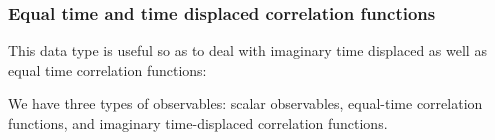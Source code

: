 \subsubsection{ Equal time and time displaced correlation functions}

This data type is useful so as to deal with  imaginary time displaced as well as equal time correlation functions: 



We have three types of observables: scalar observables, equal-time correlation functions, and imaginary time-displaced correlation functions.


